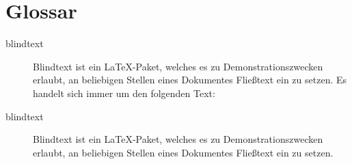 

\chapter*{Glossar}

\begin{description}
\item [blindtext] Blindtext ist ein \LaTeX-Paket, welches es zu Demonstrationszwecken erlaubt, an beliebigen Stellen eines Dokumentes Fließtext ein zu setzen. Es handelt sich immer um den folgenden Text:

\blindtext
\item [blindtext] Blindtext ist ein \LaTeX-Paket, welches es zu Demonstrationszwecken erlaubt, an beliebigen Stellen eines Dokumentes Fließtext ein zu setzen.
\end{description}